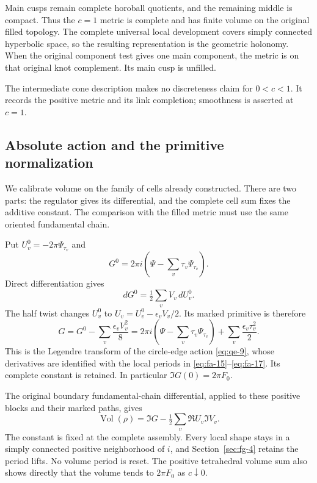 Main cusps remain complete horoball quotients, and the remaining middle is compact. Thus the \(c=1\) metric is complete and has finite volume on the original filled topology. The complete universal local development covers simply connected hyperbolic space, so the resulting representation is the geometric holonomy. When the original component test gives one main component, the metric is on that original knot complement. Its main cusp is unfilled.

The intermediate cone description makes no discreteness claim for \(0<c<1\). It records the positive metric and its link completion; smoothness is asserted at \(c=1\).

\subsection{Absolute action and the primitive normalization}\label{sec:fg-6}

We calibrate volume on the family of cells already constructed. There
are two parts: the regulator gives its differential, and the complete
cell sum fixes the additive constant. The comparison with the filled
metric must use the same oriented fundamental chain.

Put \(U_v^0=-2\pi\Psi_{\tau_v}\) and
\begin{equation}
G^0=2\pi i\left(\Psi-\sum_v\tau_v\Psi_{\tau_v}\right).
\label{eq:fg-13}
\end{equation}
Direct differentiation gives
\begin{equation}
dG^0=\tfrac12\sum_vV_v\,dU_v^0.
\label{eq:fg-14}
\end{equation}
The half twist changes \(U_v^0\) to \(U_v=U_v^0-\epsilon_vV_v/2\). Its marked primitive is therefore
\begin{equation}
G=G^0-\sum_v\frac{\epsilon_vV_v^2}{8}
 =2\pi i\left(\Psi-\sum_v\tau_v\Psi_{\tau_v}\right)
                          +\sum_v\frac{\epsilon_v\tau_v^2}{2}.
\label{eq:fg-15}
\end{equation}
This is the Legendre transform of the circle-edge action
\eqref{eq:qe-9}, whose derivatives are identified with the local
periods in \eqref{eq:fa-15}--\eqref{eq:fa-17}. Its complete constant
is retained. In particular \(\Im G(0)=2\pi F_0\).

The original boundary fundamental-chain differential, applied to these positive blocks and their marked paths, gives
\begin{equation}
\operatorname{Vol}(\rho)
                  =\Im G-\tfrac12\sum_v\Re U_v\Im V_v.
\label{eq:fg-16}
\end{equation}
The constant is fixed at the complete assembly. Every local shape stays in a simply connected positive neighborhood of \(i\), and Section~\ref{sec:fg-4} retains the period lifts. No volume period is reset. The positive tetrahedral volume sum also shows directly that the volume tends to \(2\pi F_0\) as \(c\downarrow0\).

